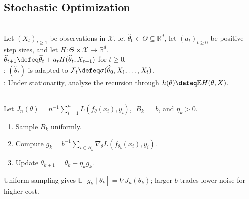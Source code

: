 \subsection{Stochastic Optimization}

\begin{definition} \label{def:online-estimator-recursion} \\
Let $(X_t)_{t\geq1}$ be observations in $\mathcal{X}$, let $\widehat{\theta}_0\in\Theta\subseteq\mathbb{R}^d$, let $(a_t)_{t\geq0}$ be positive step sizes, and let $H:\Theta\times\mathcal{X}\to\mathbb{R}^d$.\\
$\widehat{\theta}_{t+1}\defeq\widehat{\theta}_t+a_tH(\widehat{\theta}_t,X_{t+1})$ for $t\geq0$.\\
: $(\widehat{\theta}_t)$ is adapted to $\mathcal{F}_t\defeq\sigma(\widehat{\theta}_0,X_1,\ldots,X_t)$.\\
: Under stationarity, analyze the recursion through $h(\theta)\defeq\mathbb{E}H(\theta,X)$.
\end{definition}

\begin{method} \label{method:sl-sgd-minibatch} \\
Let $J_n(\theta)=n^{-1}\sum\limits_{i=1}^nL(f_\theta(x_i),y_i)$, $|B_k|=b$, and $\eta_k>0$.
\begin{enumerate}[label=(\roman*)]
\setlength{\itemsep}{0pt}
\item Sample $B_k$ uniformly.
\item Compute $g_k=b^{-1}\sum_{i\in B_k}\nabla_{\theta}L(f_{\theta_k}(x_i),y_i)$.
\item Update $\theta_{k+1}=\theta_k-\eta_kg_k$.
\end{enumerate}
Uniform sampling gives $\mathbb E[g_k\mid\theta_k]=\nabla J_n(\theta_k)$; larger $b$ trades lower noise for higher cost.
\end{method}

